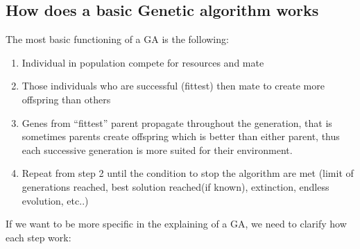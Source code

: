 \documentclass{article}
\begin{document}
\subsection{How does a basic Genetic algorithm works}
The most basic functioning of a GA is the following:
\begin{enumerate}
    \item Individual in population compete for resources and mate
    \item Those individuals who are successful (fittest) then mate to create more offspring than others
    \item Genes from “fittest” parent propagate throughout the generation, that is sometimes parents create offspring which is better than either parent, thus each successive generation is more suited for their environment.
    \item Repeat from step 2 until the condition to stop the algorithm are met (limit of generations reached, best solution reached(if known), extinction, endless evolution, etc..)   
\end{enumerate}
If we want to be more specific in the explaining of a GA, we need to clarify how each step work: 
\end{document}
